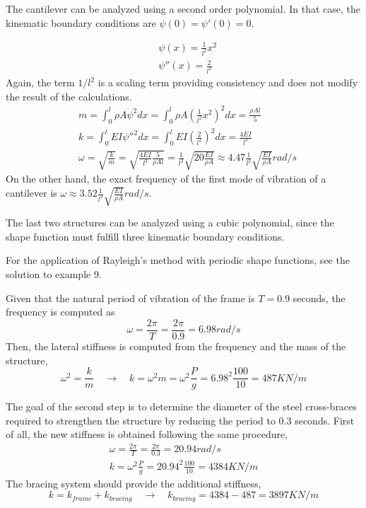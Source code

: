 \parbox{.7\textwidth}{The cantilever can be analyzed using a second order polynomial. In that case, the kinematic boundary conditions are $\psi(0) = \psi'(0) = 0$.} \hspace{1em}
\parbox{.25\textwidth}{}
\begin{align*}
&\psi(x) = \frac{1}{l^2} x^2 \\
&\psi''(x) = \frac{2}{l^2}
\end{align*}
Again, the term $1/l^2$ is a scaling term providing consistency and does not modify the result of the calculations.
\begin{align*}
&m = \int_0^l \rho A\psi^2dx = \int_0^l \rho A \left(\frac{1}{l^2} x^2\right)^2dx = \frac{\rho Al}{5} \\
&k = \int_0^l EI \psi''^2 dx = \int_0^l EI \left(\frac{2}{l^2}\right)^2dx = \frac{4EI}{l^3} \\
&\omega = \sqrt{\frac{k}{m}} = \sqrt{\frac{4EI}{l^3}\frac{5}{\rho Al}} = \frac{1}{l^2}\sqrt{20\frac{EI}{\rho A}} \approx 4.47\frac{1}{l^2}\sqrt{\frac{EI}{\rho A}} rad/s
\end{align*}
On the other hand, the exact frequency of the first mode of vibration of a cantilever is $\omega\approx3.52\frac{1}{l^2}\sqrt{\frac{EI}{\rho A}}rad/s$.

The last two structures can be analyzed using a cubic polynomial, since the shape function must fulfill three kinematic boundary conditions.

For the application of Rayleigh's method with periodic shape functions, see the solution to example 9.



Given that the natural period of vibration of the frame is $T=0.9$ seconds, the frequency is computed as
$$
\omega = \frac{2\pi}{T} = \frac{2\pi}{0.9} = 6.98rad/s
$$
Then, the lateral stiffness is computed from the frequency and the mass of the structure,
$$
\omega^2 = \frac{k}{m} \quad \rightarrow \quad
k = \omega^2m = \omega^2\frac{P}{g} = 6.98^2\frac{100}{10} = 487KN/m
$$

The goal of the second step is to determine the diameter of the steel cross-braces required to strengthen the structure by reducing the period to 0.3 seconds. First of all, the new stiffness is obtained following the same procedure,
\begin{align*}
\omega = \frac{2\pi}{T} = \frac{2\pi}{0.3} = 20.94rad/s \\
k = \omega^2\frac{P}{g} = 20.94^2\frac{100}{10} = 4384KN/m
\end{align*}
The bracing system should provide the additional stiffness,
$$
k = k_{frame} + k_{bracing} \quad \rightarrow \quad k_{bracing} = 4384 - 487 = 3897KN/m
$$

